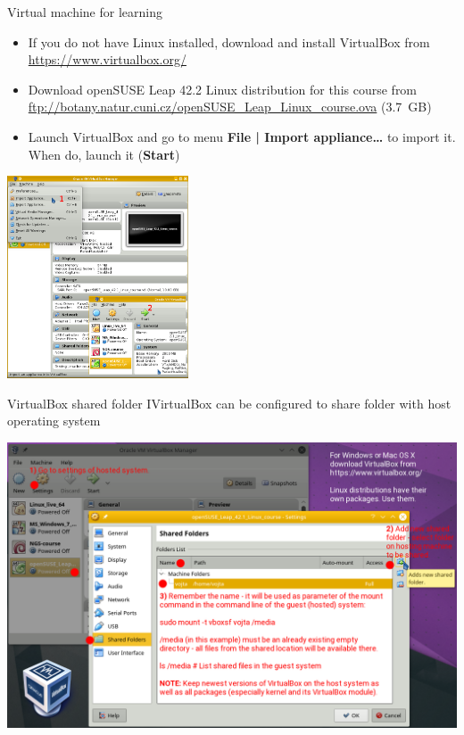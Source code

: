 \documentclass[compress, ucs, xelatex, 11pt, xcolor=svgnames,
  hyperref={
    bookmarks=true,
    unicode=true,
    colorlinks=true,
    pdftitle={Linux, command line and MetaCentrum},
    plainpages=false,
    pdfauthor={Vojtech Zeisek},
    pdfsubject={Course about use of Linux command line, writing shell scripts and using MetaCentrum of CESNET},
    pdfcreator={XeLaTeX},
    pdfkeywords={Linux, GNU, BASH, shell, command line, MetaCentrum},
    linkcolor=DarkRed,
    anchorcolor=DarkBlue,
    citecolor=Indigo,
    filecolor=NavyBlue,
    menucolor=DarkMagenta,
    urlcolor=DarkBlue,
    pdftex},
  url={hyphens, lowtilde} %
  ]{beamer}
\begin{document}
\begin{frame}{Virtual machine for learning}
  \label{VBox}
  \begin{multicols}{2}
    \begin{itemize}
      \item If you do not have Linux installed, download and install VirtualBox from \url{https://www.virtualbox.org/}
      \item Download openSUSE Leap 42.2 Linux distribution for this course from \url{ftp://botany.natur.cuni.cz/openSUSE_Leap_Linux_course.ova} (3.7~GB)
      \item Launch VirtualBox and go to menu \textbf{File | Import appliance\ldots} to import it. When do, launch it (\textbf{Start})
    \end{itemize}
    \includegraphics[height=6cm]{virtualbox.png}
  \end{multicols}
\end{frame}

\begin{frame}{VirtualBox shared folder I}{VirtualBox can be configured to share folder with host operating system}
  \begin{center}
    \includegraphics[width=\textwidth-2cm]{virtualbox_shared_folder_1.png}
  \end{center}
\end{frame}
\end{document}
